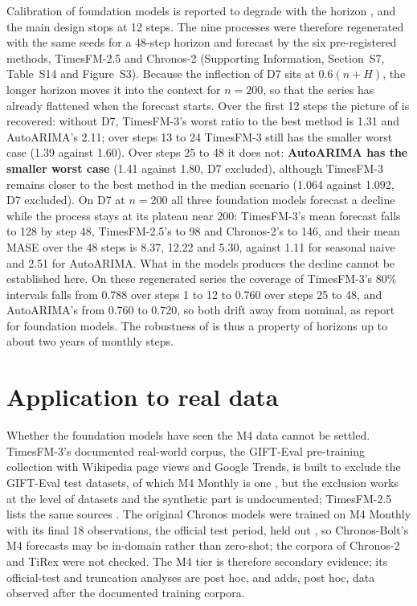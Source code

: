Calibration of foundation models is reported to degrade with the horizon \citep{adler2026calibrated}, and the
main design stops at 12 steps. The nine processes were therefore regenerated with the same seeds for a
48-step horizon and forecast by the six pre-registered methods, TimesFM-2.5 and Chronos-2 (Supporting
Information, Section~S7, Table~S14 and Figure~S3). Because the inflection of D7 sits at $0.6(n + H)$, the
longer horizon moves it into the context for $n = 200$, so that the series has already flattened when the
forecast starts. Over the first 12 steps the picture of  is recovered: without D7,
TimesFM-3's worst ratio to the best method is 1.31 and AutoARIMA's 2.11; over steps 13 to 24 TimesFM-3 still
has the smaller worst case (1.39 against 1.60). Over steps 25 to 48 it does not: \textbf{AutoARIMA has the
smaller worst case} (1.41 against 1.80, D7 excluded), although TimesFM-3 remains closer to the best method in the median scenario
(1.064 against 1.092, D7 excluded). On D7 at $n = 200$ all three foundation models forecast a decline while the
process stays at its plateau near 200: TimesFM-3's mean forecast falls to 128 by step 48, TimesFM-2.5's to 98
and Chronos-2's to 146, and their mean MASE over the 48 steps is 8.37, 12.22 and 5.30, against 1.11 for
seasonal naive and 2.51 for AutoARIMA. What in the models produces the decline cannot be established here.
On these regenerated series the coverage of TimesFM-3's 80\% intervals falls from 0.788 over steps 1 to 12 to
0.760 over steps 25 to 48, and AutoARIMA's from 0.760 to 0.720, so both drift away from nominal, as
\citet{adler2026calibrated} report for foundation models. The robustness of  is
thus a property of horizons up to about two years of monthly steps.

\section{Application to real data}
\label{sec:realdata}

Whether the foundation models have seen the M4 data cannot be settled. TimesFM-3's documented real-world
corpus, the GIFT-Eval pre-training collection with Wikipedia page views and Google Trends, is built to
exclude the GIFT-Eval test datasets, of which M4 Monthly is one \citep{timesfm3card, aksu2024gifteval,
giftevalpretrain}, but the exclusion works at the level of datasets and the synthetic part is undocumented;
TimesFM-2.5 lists the same sources \citep{timesfm25card}. The original Chronos models were trained on M4
Monthly with its final 18 observations, the official test period, held out \citep[Table~2]{ansari2024chronos},
so Chronos-Bolt's M4 forecasts may be in-domain rather than zero-shot; the corpora of Chronos-2 and TiRex were
not checked. The M4 tier is therefore secondary evidence; its official-test and truncation analyses are post hoc, and
 adds, post hoc, data observed after the documented training corpora.

